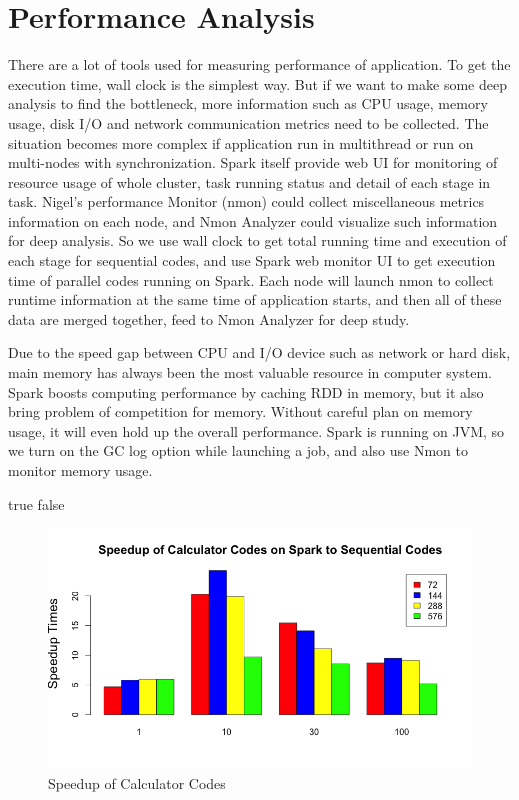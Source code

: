 \section{Performance Analysis}
There are a lot of tools used for measuring performance of application. To get the execution time, wall clock is the simplest way. But if we want to make some deep analysis to find the bottleneck, more information such as CPU usage, memory usage, disk I/O and network communication metrics need to be collected. The situation becomes more complex if application run in multithread or run on multi-nodes with synchronization. Spark itself provide web UI for monitoring of resource usage of whole cluster, task running status and detail of each stage in task. Nigel's performance Monitor (nmon) could collect miscellaneous metrics information on each node, and Nmon Analyzer could visualize such information for deep analysis. So we use wall clock to get total running time and execution of each stage for sequential codes, and use Spark web monitor UI to get execution time of parallel codes running on Spark. Each node will launch nmon to collect runtime information at the same time of application starts, and then all of these data are merged together, feed to Nmon Analyzer for deep study. 

Due to the speed gap between CPU and I/O device such as network or hard disk, main memory has always been the most valuable resource in computer system. Spark boosts computing performance by caching  RDD in memory, but it also bring problem of competition for memory. Without careful plan on memory usage, it will even hold up the overall performance. Spark is running on JVM, so we turn on the GC log option while launching a job, and also use Nmon to monitor memory usage.  

\ifx true false
\begin{figure}[h]
\includegraphics[scale=.60]{figures/CalcSpeedup.png}
\caption{Speedup of Calculator Codes}
\label{CalcSpeedup}
\end{figure}
\fi 

